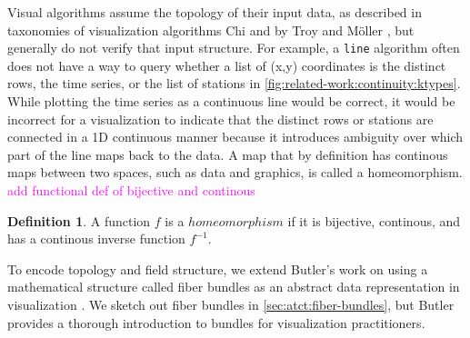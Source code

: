 \documentclass[journal]{IEEEtran}
\newcommand{\note}[1]{\textcolor{magenta}{#1}}
\theoremstyle{definition}
\newtheorem{definition}{Definition}[section]
\theoremstyle{remark}
\begin{document}
Visual algorithms assume the topology of their input data, as described in taxonomies of visualization algorithms Chi\cite{chiTaxonomyVisualizationTechniques2000} and by Troy and M\"{o}ller \cite{toryRethinkingVisualizationHighlevel2004}, but generally do not verify that input structure. For example, a \texttt{line} algorithm often does not have a way to query whether a list of (x,y) coordinates is the distinct rows, the time series, or the list of stations in \autoref{fig:related-work:continuity:ktypes}. While plotting the time series as a continuous line would be correct, it would be incorrect for a visualization to indicate that the distinct rows or stations are connected in a 1D continuous manner because it introduces ambiguity over which part of the line maps back to the data. A map that by definition has continous maps between two spaces, such as data and graphics, is called a homeomorphism\cite{riehlCategoryTheoryContext}. 
\note{add functional def of bijective and continous
}
\begin{definition}
  A function $f$ is a $homeomorphism$ if it is bijective, continous, and has a continous inverse function $f^{-1}$. 
\end{definition}

To encode topology and field structure, we extend Butler's work on using a mathematical structure called fiber bundles as an abstract data representation in visualization \cite{butlerVectorBundleClassesForm1992, butlerVisualizationModelBased1989}. We sketch out fiber bundles in \autoref{sec:atct:fiber-bundles}, but Butler provides a thorough introduction to bundles for visualization practitioners.
\end{document}
